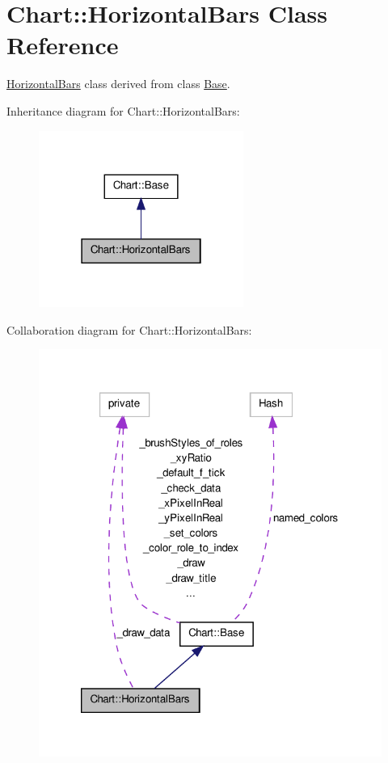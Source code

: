 \hypertarget{classChart_1_1HorizontalBars}{
\section{Chart::HorizontalBars Class Reference}
\label{classChart_1_1HorizontalBars}
}


\hyperlink{classChart_1_1HorizontalBars}{HorizontalBars} class derived from class \hyperlink{classChart_1_1Base}{Base}.  




Inheritance diagram for Chart::HorizontalBars:\nopagebreak
\begin{figure}[H]
\begin{center}
\leavevmode
\includegraphics[width=190pt]{classChart_1_1HorizontalBars__inherit__graph}
\end{center}
\end{figure}


Collaboration diagram for Chart::HorizontalBars:\nopagebreak
\begin{figure}[H]
\begin{center}
\leavevmode
\includegraphics[width=320pt]{classChart_1_1HorizontalBars__coll__graph}
\end{center}
\end{figure}

